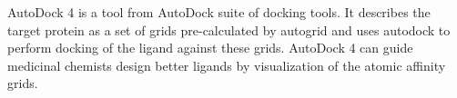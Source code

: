 AutoDock 4 is a tool from AutoDock suite of docking tools. It describes the target protein as a set of grids pre-calculated by autogrid and uses autodock to perform docking of the ligand against these grids. AutoDock 4 can guide medicinal chemists design better ligands by visualization of the atomic affinity grids. 